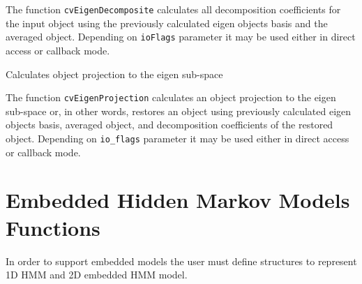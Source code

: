 The function \texttt{cvEigenDecomposite} calculates all decomposition coefficients for the input object using the previously calculated eigen objects basis and the averaged object. Depending on \texttt{ioFlags} parameter it may be used either in direct access or callback mode.


Calculates object projection to the eigen sub-space


\begin{description}
\end{description}

The function \texttt{cvEigenProjection} calculates an object projection to the eigen sub-space or, in other words, restores an object using previously calculated eigen objects basis, averaged object, and decomposition coefficients of the restored object. Depending on \texttt{io\_flags} parameter it may be used either in direct access or callback mode.

\section{Embedded Hidden Markov Models Functions}

In order to support embedded models the user must define structures to represent 1D HMM and 2D embedded HMM model.


